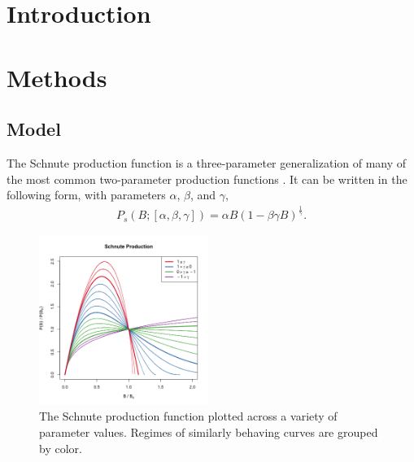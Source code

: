 %
\section{\color{red}Introduction\label{ptInt}}

%
\section{Methods \label{meth}}


%
\subsection{Model}

%
The Schnute production function is a three-parameter generalization of many of
the most common two-parameter production functions \cite{deriso_harvesting_1980, schnute_general_1985}. %
It can be written in the following form, with parameters $\alpha$, $\beta$, and $\gamma$,
%
\begin{align}
P_s(B; [\alpha, \beta, \gamma]) = \alpha B (1-\beta\gamma B)^{\frac{1}{\gamma}}.
\end{align}

%
\begin{figure}
\vspace{-0.6cm}
\includegraphics[width=0.49\textwidth]{../gpBias/g3.png}
\vspace{-1cm}
\caption{
The Schnute production function plotted across a variety of parameter
values. Regimes of similarly behaving curves are grouped by color.
}
\label{sRegimes}
\end{figure}

